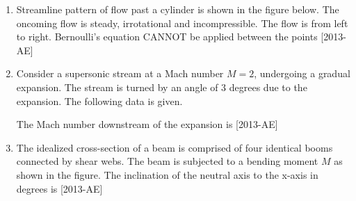 \documentclass[journal]{IEEEtran}
\begin{document}
\begin{enumerate}[start=27]
\begin{enumerate}
\end{enumerate}
\item Streamline pattern of flow past a cylinder is shown in the figure below. The oncoming flow is steady, irrotational and incompressible. The flow is from left to right. Bernoulli's equation CANNOT be applied between the points \hfill{[2013-AE]}\\
\begin{figure}[H]
			\centering
			
			\label{36}
		\end{figure}
\begin{enumerate}
\end{enumerate}
\item Consider a supersonic stream at a Mach number $M=2$, undergoing a gradual expansion. The stream is turned by an angle of $3$ degrees due to the expansion. The following data is given.\\
\begin{table}[H]    
  \centering
  
  \label{tab1-1.8-10}
\end{table}
The Mach number downstream of the expansion is \hfill{[2013-AE]}
\begin{enumerate}
\end{enumerate}
\item The idealized cross-section of a beam is comprised of four identical booms connected by shear webs. The beam is subjected to a bending moment $M$ as shown in the figure. The inclination of the neutral axis to the x-axis in degrees is \hfill{[2013-AE]}\\

\end{enumerate}
\end{document}
